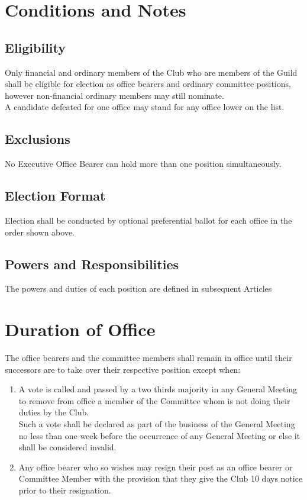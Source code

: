 \documentclass[10pt,a4paper]{report}
\begin{document}
	\section{Conditions and Notes}
		\subsection{Eligibility} Only financial and ordinary members of the Club who are members of the Guild shall be eligible for election as office bearers and ordinary committee positions, however non-financial ordinary members may still nominate.\\
		A candidate defeated for one office may stand for any office lower on the list.

		\subsection{Exclusions} No Executive Office Bearer can hold more than one position simultaneously.

		\subsection{Election Format} Election shall be conducted by optional preferential ballot for each office in the order shown above.

		\subsection{Powers and Responsibilities} The powers and duties of each position are defined in subsequent Articles

	\section{Duration of Office}
		The office bearers and the committee members shall remain in office until their successors are to take over their respective position except when:
			\begin{enumerate}[label=\alph*]
			\item A vote is called and passed by a two thirds majority in any General Meeting to remove from office a member of the Committee whom is not doing their duties by the Club.\\
			Such a vote shall be declared as part of the business of the General Meeting no less than one week before the occurrence of any General Meeting or else it shall be considered invalid.
			\item Any office bearer who so wishes may resign their post as an office bearer or Committee Member with the provision that they give the Club 10 days notice prior to their resignation.
		\end{enumerate}
\end{document}
